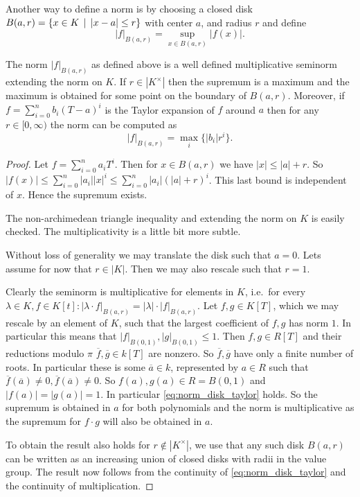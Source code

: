 Another way to define a norm is by choosing a closed disk $B(a, r) = \{x \in K \st |x - a| \le r\} $ with center $a$, and radius $r$ and define \[
	|f|_{B(a, r)} = \sup_{x \in B(a, r)} |f(x)|
.\] 
\begin{claim}
	The norm $|f|_{B(a, r)}$ as defined above is a well defined multiplicative seminorm extending the norm on $K$. 
	If $r \in |K^{\times }|$ then the supremum is a maximum and the maximum is obtained for some point on the boundary of $B(a, r)$.
	Moreover, if  $f = \sum_{i = 0}^{n} b_i (T-a)^{i}$ is the Taylor expansion of $f$ around $a$ then for any $r \in [0, \infty)$ the norm can be computed as \begin{equation}\label{eq:norm_disk_taylor}
		|f|_{B(a, r)} = \max_{i}\{  |b_i|r^{i}\}
	.\end{equation} 
\end{claim}
\begin{proof}
	Let $f = \sum_{i = 0}^{n} a_i T^{i}$. 
	Then for $x \in B(a, r)$ we have $|x| \le |a| + r$. 
	So  $|f(x)| \le  \sum_{i = 0}^{n} |a_i| |x|^{i} \le \sum_{i = 0}^{n}|a_i| (|a| + r)^{i} $. 
	This last bound is independent of $x$. Hence the supremum exists. 

	The non-archimedean triangle inequality and extending the norm on $K$ is easily checked. 
	The multiplicativity is a little bit more subtle. 

	Without loss of generality we may translate the disk such that $a = 0$. 
	Lets assume for now that $r \in |K|$.
	Then we may also rescale such that $r = 1$. 

	Clearly the seminorm is multiplicative for elements in  $K$, i.e.\ for every $\lambda \in K, f \in K[t]: |\lambda \cdot f|_{B(a, r)} = |\lambda|\cdot |f|_{B(a, r)}$.  Let $f, g \in K[T]$, which we may rescale by an element of $K$, such that the largest coefficient of $f, g$ has norm $1$. In particular this means that $|f|_{B(0,1)}, |g|_{B(0,1)} \le 1$. 
	Then $f, g \in R[T]$ and their  reductions modulo  $\pi$ $\overline{f}, \overline{g} \in k[T]$ are nonzero.
	So $\overline{f}, \overline{g}$ have only a finite number of roots. In particular these is some $\overline{a} \in k$, represented by $a \in R$ such that $\overline{f}(\overline{a}) \ne 0, \overline{f}(\overline{a})\ne 0$. 
	So $f(a), g(a) \in R = B(0, 1)$ and $|f(a)| = |g(a)| = 1$. 
	In particular \cref{eq:norm_disk_taylor} holds. 
	So the supremum is obtained in $a$ for both polynomials and the norm is multiplicative as the supremum for $f\cdot g$ will also be obtained in $a$. 


	To obtain the result also holds for $r \not\in |K^{\times }|$, we use that any such disk $B(a, r)$ can be written as an increasing union of closed disks with radii in the value group. The result now follows from the continuity of \cref{eq:norm_disk_taylor} and the continuity of multiplication. 
\end{proof}




